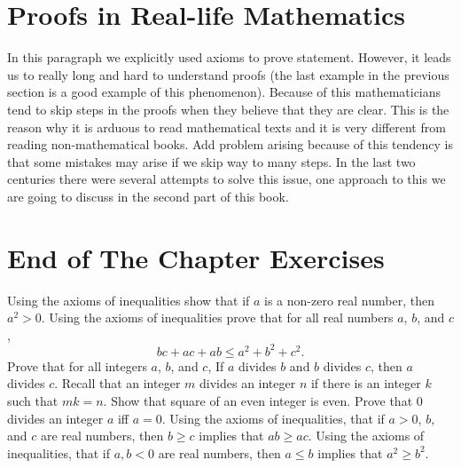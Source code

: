 \section{Proofs in Real-life Mathematics}
In this paragraph we explicitly used axioms to prove statement. However, it
leads us to really long and hard to understand proofs (the last example in the
previous section is a good example of this phenomenon). Because of this
mathematicians tend to skip steps in the proofs when they believe that they are
clear. This is the reason why it is arduous to read mathematical texts and it
is very different from reading non-mathematical books. Add problem arising
because of this tendency is that some mistakes may arise if we skip way to many
steps. In the last two centuries there were several attempts to solve this
issue, one approach to this we are going to discuss in the second part of this
book.

\section*{End of The Chapter Exercises}
\begin{exercises}
  \exerciseitem Using the axioms of inequalities show that if $a$ is a non-zero
    real number, then $a^2 > 0$.
  \exerciseitem Using the axioms of inequalities prove that for all real
    numbers $a$, $b$, and $c$, $$bc + ac + ab \le a^2 + b^2 + c^2.$$
  \exerciseitem Prove that for all integers $a$, $b$, and $c$,
    If $a$ divides $b$ and $b$ divides $c$, then $a$ divides $c$.
    Recall that an integer $m$ divides an integer $n$ if there is an integer
    $k$ such that $mk = n$.
  \exerciseitem Show that square of an even integer is even.
  \exerciseitem Prove that $0$ divides an integer $a$ iff $a = 0$.
  \exerciseitem Using the axioms of inequalities, that if $a > 0$, $b$, and $c$
    are real numbers, then $b \ge c$ implies that $ab \ge ac$.
  \exerciseitem Using the axioms of inequalities, that if $a, b < 0$ are real
    numbers, then $a \le b$ implies that $a^2 \ge b^2$.
\end{exercises}
